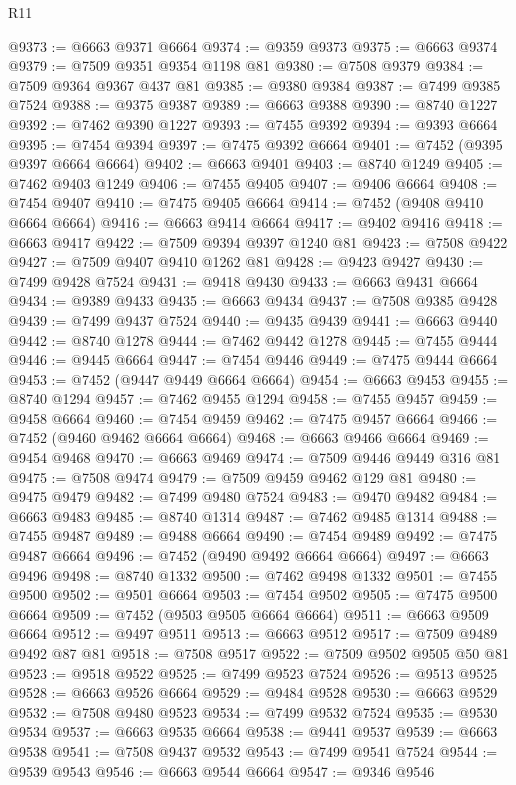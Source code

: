 \begin{lexlean}{R11}
\begin{coremodule}
{{{{{{{{{{{{{{{{{{{{{{{{{{{{{{{{{{{{{{{{{{{{{{{{{{{{{{{{{{{{{{{{{{{{{{{{{{{{{{{{{{@9373 := @6663 @9371 @6664
@9374 := @9359 @9373
@9375 := @6663 @9374
@9379 := @7509 @9351 @9354 @1198 @81
@9380 := @7508 @9379
@9384 := @7509 @9364 @9367 @437 @81
@9385 := @9380 @9384
@9387 := @7499 @9385 @7524
@9388 := @9375 @9387
@9389 := @6663 @9388
@9390 := @8740 @1227
@9392 := @7462 @9390 @1227
@9393 := @7455 @9392
@9394 := @9393 @6664
@9395 := @7454 @9394
@9397 := @7475 @9392 @6664
@9401 := @7452 (@9395 @9397 @6664 @6664)
@9402 := @6663 @9401
@9403 := @8740 @1249
@9405 := @7462 @9403 @1249
@9406 := @7455 @9405
@9407 := @9406 @6664
@9408 := @7454 @9407
@9410 := @7475 @9405 @6664
@9414 := @7452 (@9408 @9410 @6664 @6664)
@9416 := @6663 @9414 @6664
@9417 := @9402 @9416
@9418 := @6663 @9417
@9422 := @7509 @9394 @9397 @1240 @81
@9423 := @7508 @9422
@9427 := @7509 @9407 @9410 @1262 @81
@9428 := @9423 @9427
@9430 := @7499 @9428 @7524
@9431 := @9418 @9430
@9433 := @6663 @9431 @6664
@9434 := @9389 @9433
@9435 := @6663 @9434
@9437 := @7508 @9385 @9428
@9439 := @7499 @9437 @7524
@9440 := @9435 @9439
@9441 := @6663 @9440
@9442 := @8740 @1278
@9444 := @7462 @9442 @1278
@9445 := @7455 @9444
@9446 := @9445 @6664
@9447 := @7454 @9446
@9449 := @7475 @9444 @6664
@9453 := @7452 (@9447 @9449 @6664 @6664)
@9454 := @6663 @9453
@9455 := @8740 @1294
@9457 := @7462 @9455 @1294
@9458 := @7455 @9457
@9459 := @9458 @6664
@9460 := @7454 @9459
@9462 := @7475 @9457 @6664
@9466 := @7452 (@9460 @9462 @6664 @6664)
@9468 := @6663 @9466 @6664
@9469 := @9454 @9468
@9470 := @6663 @9469
@9474 := @7509 @9446 @9449 @316 @81
@9475 := @7508 @9474
@9479 := @7509 @9459 @9462 @129 @81
@9480 := @9475 @9479
@9482 := @7499 @9480 @7524
@9483 := @9470 @9482
@9484 := @6663 @9483
@9485 := @8740 @1314
@9487 := @7462 @9485 @1314
@9488 := @7455 @9487
@9489 := @9488 @6664
@9490 := @7454 @9489
@9492 := @7475 @9487 @6664
@9496 := @7452 (@9490 @9492 @6664 @6664)
@9497 := @6663 @9496
@9498 := @8740 @1332
@9500 := @7462 @9498 @1332
@9501 := @7455 @9500
@9502 := @9501 @6664
@9503 := @7454 @9502
@9505 := @7475 @9500 @6664
@9509 := @7452 (@9503 @9505 @6664 @6664)
@9511 := @6663 @9509 @6664
@9512 := @9497 @9511
@9513 := @6663 @9512
@9517 := @7509 @9489 @9492 @87 @81
@9518 := @7508 @9517
@9522 := @7509 @9502 @9505 @50 @81
@9523 := @9518 @9522
@9525 := @7499 @9523 @7524
@9526 := @9513 @9525
@9528 := @6663 @9526 @6664
@9529 := @9484 @9528
@9530 := @6663 @9529
@9532 := @7508 @9480 @9523
@9534 := @7499 @9532 @7524
@9535 := @9530 @9534
@9537 := @6663 @9535 @6664
@9538 := @9441 @9537
@9539 := @6663 @9538
@9541 := @7508 @9437 @9532
@9543 := @7499 @9541 @7524
@9544 := @9539 @9543
@9546 := @6663 @9544 @6664
@9547 := @9346 @9546
}}}}}}}}}}}}}}}}}}}}}}}}}}}}}}}}}}}}}}}}}}}}}}}}}}}}}}}}}}}}}}}}}}}}}}}}}}}}}}}}}}
\end{coremodule}
\end{lexlean}
